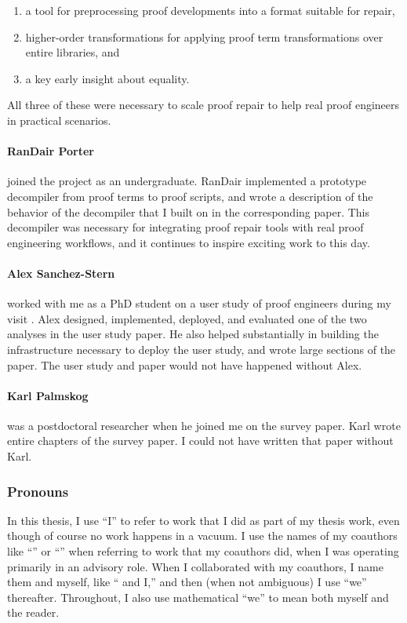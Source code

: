 \begin{enumerate}
\item a tool for preprocessing proof developments into a format suitable for repair,
\item higher-order transformations for applying proof term transformations over entire libraries, and
\item a key early insight about equality.
\end{enumerate}
All three of these were necessary to scale proof repair to help real proof engineers in practical scenarios.

\paragraph{RanDair Porter}
 joined the project as an undergraduate.
RanDair implemented a prototype decompiler from proof terms to proof scripts,
and wrote a description of the behavior of the decompiler that I built on in the corresponding paper.
This decompiler was necessary for integrating proof repair tools with real proof engineering workflows,
and it continues to inspire exciting work to this day.

\paragraph{Alex Sanchez-Stern}
 worked with me as a PhD student on a user study of proof engineers during my visit .
Alex designed, implemented, deployed, and evaluated one of the two analyses in the user study paper.
He also helped substantially in building the infrastructure necessary to deploy the user study,
and wrote large sections of the paper.
The user study and paper would not have happened without Alex.

\paragraph{Karl Palmskog}
 was a postdoctoral researcher when he joined me on the survey paper.
Karl wrote entire chapters of the survey paper.
I could not have written that paper without Karl.

\subsubsection*{Pronouns}

In this thesis, I use ``I'' to refer to work that I did as part of my thesis work,
even though of course no work happens in a vacuum.
I use the names of my coauthors like ``'' or ``'' when referring to work that my coauthors did,
when I was operating primarily in an advisory role.
When I collaborated with my coauthors, I name them and myself, like `` and I,''
and then (when not ambiguous) I use ``we'' thereafter.
Throughout, I also use mathematical ``we'' to mean both myself and the reader.

